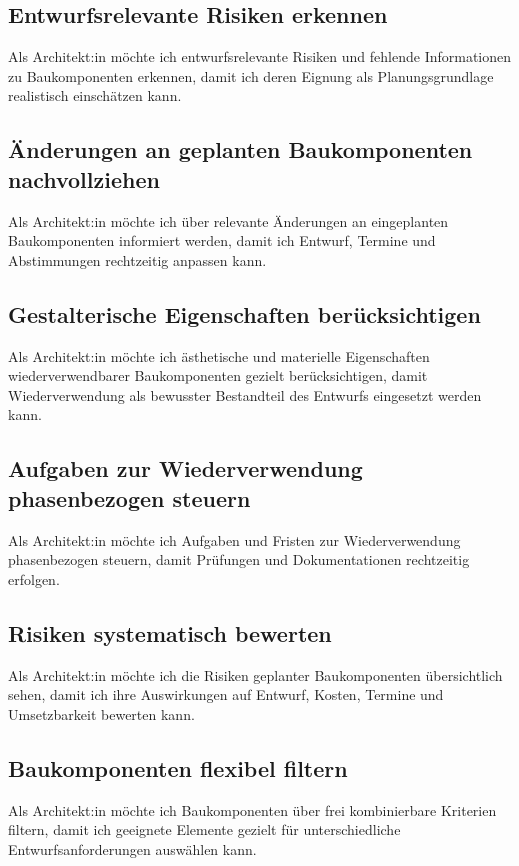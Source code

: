 \subsection{Entwurfsrelevante Risiken erkennen}
\label{us:a-06} Als Architekt:in möchte ich entwurfsrelevante Risiken und fehlende Informationen zu Baukomponenten erkennen, damit ich deren Eignung als Planungsgrundlage realistisch einschätzen kann.

\subsection{Änderungen an geplanten Baukomponenten nachvollziehen}
\label{us:a-07} Als Architekt:in möchte ich über relevante Änderungen an eingeplanten Baukomponenten informiert werden, damit ich Entwurf, Termine und Abstimmungen rechtzeitig anpassen kann.

\subsection{Gestalterische Eigenschaften berücksichtigen}
\label{us:a-08} Als Architekt:in möchte ich ästhetische und materielle Eigenschaften wiederverwendbarer Baukomponenten gezielt berücksichtigen, damit Wiederverwendung als bewusster Bestandteil des Entwurfs eingesetzt werden kann.

\subsection{Aufgaben zur Wiederverwendung phasenbezogen steuern}
\label{us:a-09} Als Architekt:in möchte ich Aufgaben und Fristen zur Wiederverwendung phasenbezogen steuern, damit Prüfungen und Dokumentationen rechtzeitig erfolgen.

\subsection{Risiken systematisch bewerten}
\label{us:a-10} Als Architekt:in möchte ich die Risiken geplanter Baukomponenten übersichtlich sehen, damit ich ihre Auswirkungen auf Entwurf, Kosten, Termine und Umsetzbarkeit bewerten kann.

\subsection{Baukomponenten flexibel filtern}
\label{us:a-11} Als Architekt:in möchte ich Baukomponenten über frei kombinierbare Kriterien filtern, damit ich geeignete Elemente gezielt für unterschiedliche Entwurfsanforderungen auswählen kann.

